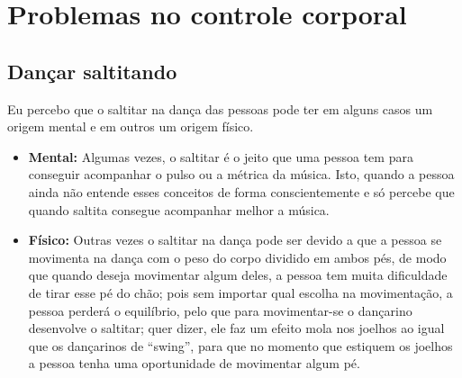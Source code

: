 \section{Problemas no controle corporal}

\subsection{Dançar saltitando}

\begin{problemT}
Eu percebo que o saltitar na dança das pessoas pode ter em alguns casos um origem mental e em outros um origem físico.
\begin{itemize}
\item \textbf{Mental:} Algumas vezes, o saltitar
é o jeito que  uma pessoa tem para conseguir acompanhar o pulso ou a métrica da música. 
Isto, quando a pessoa ainda não entende esses conceitos de forma conscientemente
e só percebe que quando saltita consegue acompanhar melhor a música.
\item \textbf{Físico:} Outras vezes o saltitar na dança pode ser devido a que a pessoa se movimenta na dança
com o peso do corpo dividido em ambos pés, de modo que quando deseja movimentar algum deles,
a pessoa tem muita dificuldade de tirar esse pé do chão; 
pois sem importar qual escolha na movimentação, a pessoa perderá o equilíbrio,
pelo que para movimentar-se o dançarino desenvolve o saltitar; quer dizer, 
ele faz um efeito mola nos joelhos ao igual que os dançarinos de ``swing'', 
para que no momento que estiquem os joelhos a pessoa tenha uma oportunidade de movimentar algum pé.    
\end{itemize}
\end{problemT}



